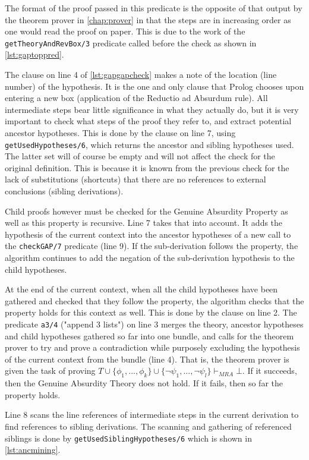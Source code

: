 \documentclass[11pt,twoside,a4paper]{report}
\begin{document}
The format of the proof passed in this predicate is the opposite of that output by the theorem prover in \autoref{chap:prover} in that the steps are in increasing order as one would read the proof on paper. This is due to the work of the \lstinline$getTheoryAndRevBox/3$ predicate called before the check as shown in \autoref{lst:gaptoppred}.

The clause on line 4 of \autoref{lst:gapgapcheck} makes a note of the location (line number) of the hypothesis. It is the one and only clause that Prolog chooses upon entering a new box (application of the Reductio ad Absurdum rule). All intermediate steps bear little significance in what they actually do, but it is very important to check what steps of the proof they refer to, and extract potential ancestor hypotheses. This is done by the clause on line 7, using \lstinline$getUsedHypotheses/6$, which returns the ancestor and sibling hypotheses used. The latter set will of course be empty and will not affect the check for the original definition. This is because it is known from the previous check for the lack of substitutions (shortcuts) that there are no references to external conclusions (sibling derivations).

Child proofs however must be checked for the Genuine Absurdity Property as well as this property is recursive. Line 7 takes that into account. It adds the hypothesis of the current context into the ancestor hypotheses of a new call to the \lstinline$checkGAP/7$ predicate (line 9). If the sub-derivation follows the property, the algorithm continues to add the negation of the sub-derivation hypothesis to the child hypotheses. 

At the end of the current context, when all the child hypotheses have been gathered and checked that they follow the property, the algorithm checks that the property holds for this context as well. This is done by the clause on line 2. The predicate \lstinline$a3/4$ ("append 3 lists") on line 3 merges the theory, ancestor hypotheses and child hypotheses gathered so far into one bundle, and calls for the theorem prover to try and prove a contradiction while purposely excluding the hypothesis of the current context from the bundle (line 4). That is, the theorem prover is given the task of proving $T\cup\{\phi_1, ..., \phi_k\}\cup\{\neg\psi_1, ..., \neg\psi_l\}\vdash_{MRA}\bot$. If it succeeds, then the Genuine Absurdity Theory does not hold. If it fails, then so far the property holds.

Line 8 scans the line references of intermediate steps in the current derivation to find references to sibling derivations. The scanning and gathering of referenced siblings is done by \lstinline$getUsedSiblingHypotheses/6$ which is shown in \autoref{lst:ancmining}.
\end{document}
